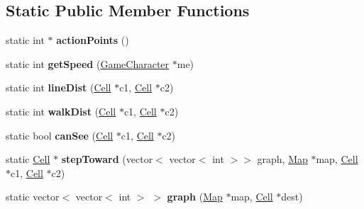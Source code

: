 \subsection*{Static Public Member Functions}
\begin{DoxyCompactItemize}
\item 
\hypertarget{class_character_strategy_a7406375b0c8aa47688ef18175e3a5fc3}{}\label{class_character_strategy_a7406375b0c8aa47688ef18175e3a5fc3} 
static int $\ast$ {\bfseries action\+Points} ()
\item 
\hypertarget{class_character_strategy_aa53149169982b157b5996ab7198689ff}{}\label{class_character_strategy_aa53149169982b157b5996ab7198689ff} 
static int {\bfseries get\+Speed} (\hyperlink{class_game_character}{Game\+Character} $\ast$me)
\item 
\hypertarget{class_character_strategy_a1e00d8d7b651d98dddc27bc416af05f8}{}\label{class_character_strategy_a1e00d8d7b651d98dddc27bc416af05f8} 
static int {\bfseries line\+Dist} (\hyperlink{class_cell}{Cell} $\ast$c1, \hyperlink{class_cell}{Cell} $\ast$c2)
\item 
\hypertarget{class_character_strategy_a54feee4e7756865d78e8db0e16ac8e21}{}\label{class_character_strategy_a54feee4e7756865d78e8db0e16ac8e21} 
static int {\bfseries walk\+Dist} (\hyperlink{class_cell}{Cell} $\ast$c1, \hyperlink{class_cell}{Cell} $\ast$c2)
\item 
\hypertarget{class_character_strategy_a8ff8f5ca3a756328ba2415035734be38}{}\label{class_character_strategy_a8ff8f5ca3a756328ba2415035734be38} 
static bool {\bfseries can\+See} (\hyperlink{class_cell}{Cell} $\ast$c1, \hyperlink{class_cell}{Cell} $\ast$c2)
\item 
\hypertarget{class_character_strategy_ab3fc9526417f85af2af1b9fc83cc8174}{}\label{class_character_strategy_ab3fc9526417f85af2af1b9fc83cc8174} 
static \hyperlink{class_cell}{Cell} $\ast$ {\bfseries step\+Toward} (vector$<$ vector$<$ int $>$$>$ graph, \hyperlink{class_map}{Map} $\ast$map, \hyperlink{class_cell}{Cell} $\ast$c1, \hyperlink{class_cell}{Cell} $\ast$c2)
\item 
\hypertarget{class_character_strategy_a4c81af91538e3140e5afc00df92cc92e}{}\label{class_character_strategy_a4c81af91538e3140e5afc00df92cc92e} 
static vector$<$ vector$<$ int $>$ $>$ {\bfseries graph} (\hyperlink{class_map}{Map} $\ast$map, \hyperlink{class_cell}{Cell} $\ast$dest)
\end{DoxyCompactItemize}
